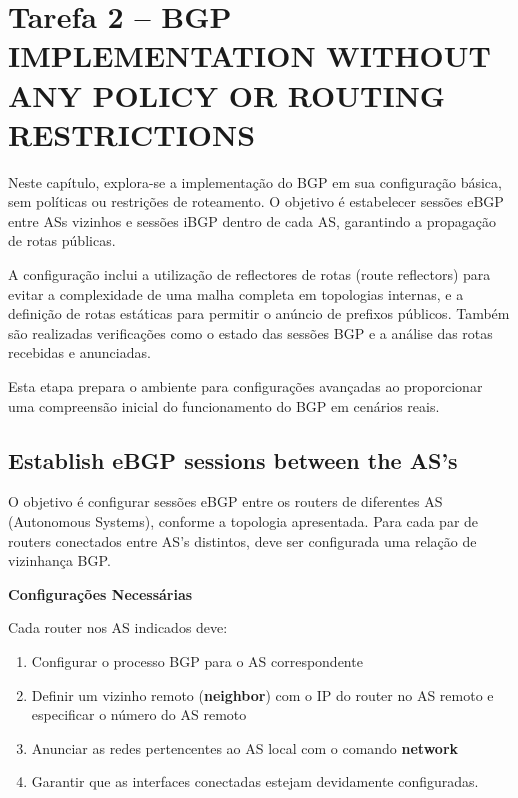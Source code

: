 \documentclass[11pt,english, openright, oneside]{book}
\begin{document}
\pagebreak
\section{Tarefa 2 -- BGP IMPLEMENTATION WITHOUT ANY POLICY OR ROUTING RESTRICTIONS}
\vspace{0.2cm}

Neste capítulo, explora-se a implementação do BGP em sua configuração básica, sem políticas ou restrições de roteamento. O objetivo é estabelecer sessões eBGP entre ASs vizinhos e sessões iBGP dentro de cada AS, garantindo a propagação de rotas públicas.

A configuração inclui a utilização de reflectores de rotas (route reflectors) para evitar a complexidade de uma malha completa em topologias internas, e a definição de rotas estáticas para permitir o anúncio de prefixos públicos. Também são realizadas verificações como o estado das sessões BGP e a análise das rotas recebidas e anunciadas.

Esta etapa prepara o ambiente para configurações avançadas ao proporcionar uma compreensão inicial do funcionamento do BGP em cenários reais.

\vspace{0.4cm}

\subsection{Establish eBGP sessions between the AS's}
\vspace{0.2cm}

O objetivo é configurar sessões eBGP entre os routers de diferentes AS (Autonomous Systems), conforme a topologia apresentada. Para cada par de routers conectados entre AS's distintos, deve ser configurada uma relação de vizinhança BGP. \par


\vspace{0.6cm}
\textbf{Configurações Necessárias} \par
\vspace{0.2cm}
Cada router nos AS indicados deve:
\begin{enumerate}
  \item Configurar o processo BGP para o AS correspondente
  \item Definir um vizinho remoto (\textbf{neighbor}) com o IP do router no AS remoto e especificar o número do AS remoto
  \item Anunciar as redes pertencentes ao AS local com o comando \textbf{network}
  \item Garantir que as interfaces conectadas estejam devidamente configuradas.
\end{enumerate} \par
\end{document}

